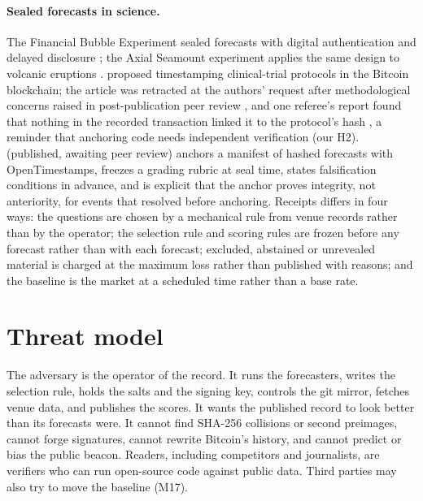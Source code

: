 \documentclass[11pt]{article}
\begin{document}
\paragraph{Sealed forecasts in science.} The Financial Bubble Experiment sealed forecasts with digital authentication and delayed disclosure \citep{sornette2010fbe}; the Axial Seamount experiment applies the same design to volcanic eruptions \citep{lei2025axial}. \citet{irving2016blockchain} proposed timestamping clinical-trial protocols in the Bitcoin blockchain; the article was retracted at the authors' request after methodological concerns raised in post-publication peer review \citep{irving2017retraction}, and one referee's report found that nothing in the recorded transaction linked it to the protocol's hash \citep{knottenbelt2017report}, a reminder that anchoring code needs independent verification (our H2). \citet{jyotish2026sealed} (published, awaiting peer review) anchors a manifest of hashed forecasts with OpenTimestamps, freezes a grading rubric at seal time, states falsification conditions in advance, and is explicit that the anchor proves integrity, not anteriority, for events that resolved before anchoring. Receipts differs in four ways: the questions are chosen by a mechanical rule from venue records rather than by the operator; the selection rule and scoring rules are frozen before any forecast rather than with each forecast; excluded, abstained or unrevealed material is charged at the maximum loss rather than published with reasons; and the baseline is the market at a scheduled time rather than a base rate.

\section{Threat model}
\label{sec:threats}

The adversary is the operator of the record. It runs the forecasters, writes the selection rule, holds the salts and the signing key, controls the git mirror, fetches venue data, and publishes the scores. It wants the published record to look better than its forecasts were. It cannot find SHA-256 collisions or second preimages, cannot forge signatures, cannot rewrite Bitcoin's history, and cannot predict or bias the public beacon. Readers, including competitors and journalists, are verifiers who can run open-source code against public data. Third parties may also try to move the baseline (M17).
\end{document}
